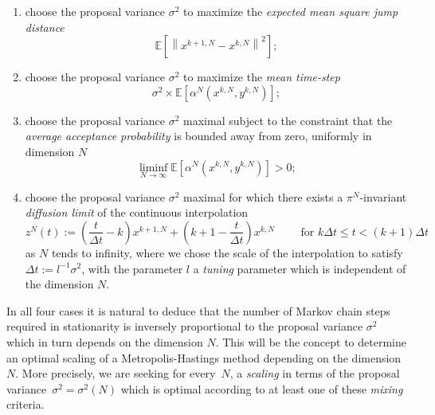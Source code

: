\begin{enumerate}
 \item choose the proposal variance $ \sigma^2 $ to maximize the \textit{expected mean square jump distance}
 \begin{equation}
  \label{CC:Mean Square jump distance}
  \mathbb{E}\left[ \left\| x^{k+1,N} - x^{k,N}  \right\|^2 \right];
 \end{equation}
 
 \item choose the proposal variance $ \sigma^2 $ to maximize the \textit{mean time-step}
 \begin{equation}
  \label{CC:mean time-step}
  \sigma^2 \times \mathbb{E}\left[ \alpha^{N}\left(x^{k,N},y^{k,N}\right) \right];
 \end{equation}
 
 \item choose the proposal variance $ \sigma^2 $ maximal subject to the constraint that the \textit{average acceptance probability} is bounded away from zero, uniformly in dimension $N$
 \begin{equation}
  \label{CC:average acceptance probability}
  \liminf_{N \to \infty} \mathbb{E} \left[  \alpha^{N}\left(x^{k,N},y^{k,N}\right) \right] > 0;
 \end{equation}
 
 \item choose the proposal variance $ \sigma^2 $ maximal for which there exists a $ \pi^{N} $-invariant \textit{diffusion limit} of the continuous interpolation
 \begin{equation}
  \label{CC:Continuous interpolation}
  z^{N}(t) := \left( \frac{t}{\Delta t} -k \right) x^{k+1,N} + \left( k+1 - \frac{t}{\Delta t} \right) x^{k,N} \qquad \text{ for } k \Delta t \leq t < (k+1)\Delta t 
  \end{equation}
  as $N$ tends to infinity, where we chose the scale of the interpolation to satisfy $ \Delta t := l^{-1} \sigma^2  $, with the parameter $l$ a \textit{tuning} parameter which is independent of the dimension $N$.
 
\end{enumerate}

In all four cases it is natural to deduce that the number of Markov chain steps
required in stationarity is inversely proportional to the proposal variance $ \sigma^2 $ which in turn depends on the dimension $N$. This will be the concept to determine an optimal scaling of a Metropolis-Hastings method depending on the dimension $N$. More precisely, we are seeking for every~$N$, a \textit{scaling} in terms of the proposal variance~$ \sigma^2 = \sigma^2 (N) $ which is optimal according to at least one of these \textit{mixing} criteria.

